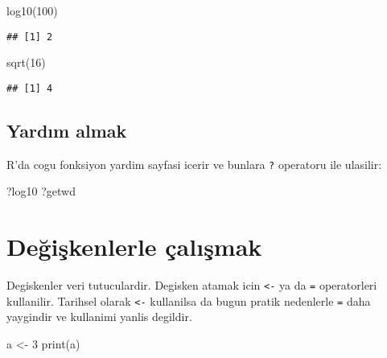 \documentclass[
]{book}
\newenvironment{Shaded}{\begin{snugshade}}{\end{snugshade}}
\newcommand{\DecValTok}[1]{\textcolor[rgb]{0.00,0.00,0.81}{#1}}
\newcommand{\FunctionTok}[1]{\textcolor[rgb]{0.00,0.00,0.00}{#1}}
\newcommand{\NormalTok}[1]{#1}
\newcommand{\OtherTok}[1]{\textcolor[rgb]{0.56,0.35,0.01}{#1}}
\begin{document}
\begin{Shaded}
\begin{Highlighting}[]
\FunctionTok{log10}\NormalTok{(}\DecValTok{100}\NormalTok{)}
\end{Highlighting}
\end{Shaded}

\begin{verbatim}
## [1] 2
\end{verbatim}

\begin{Shaded}
\begin{Highlighting}[]
\FunctionTok{sqrt}\NormalTok{(}\DecValTok{16}\NormalTok{)}
\end{Highlighting}
\end{Shaded}

\begin{verbatim}
## [1] 4
\end{verbatim}

\hypertarget{yardux131m-almak}{%
\subsection{Yardım almak}\label{yardux131m-almak}}

R'da cogu fonksiyon yardim sayfasi icerir ve bunlara \texttt{?} operatoru ile ulasilir:

\begin{Shaded}
\begin{Highlighting}[]
\NormalTok{?log10}
\NormalTok{?getwd}
\end{Highlighting}
\end{Shaded}

\hypertarget{deux11fiux15fkenlerle-uxe7alux131ux15fmak}{%
\section{Değişkenlerle çalışmak}\label{deux11fiux15fkenlerle-uxe7alux131ux15fmak}}

Degiskenler veri tutuculardir. Degisken atamak icin \texttt{\textless{}-} ya da \texttt{=} operatorleri kullanilir. Tarihsel olarak \texttt{\textless{}-} kullanilsa da bugun pratik nedenlerle \texttt{=} daha yaygindir ve kullanimi yanlis degildir.

\begin{Shaded}
\begin{Highlighting}[]
\NormalTok{a }\OtherTok{\textless{}{-}} \DecValTok{3}
\FunctionTok{print}\NormalTok{(a)}
\end{Highlighting}
\end{Shaded}
\end{document}
